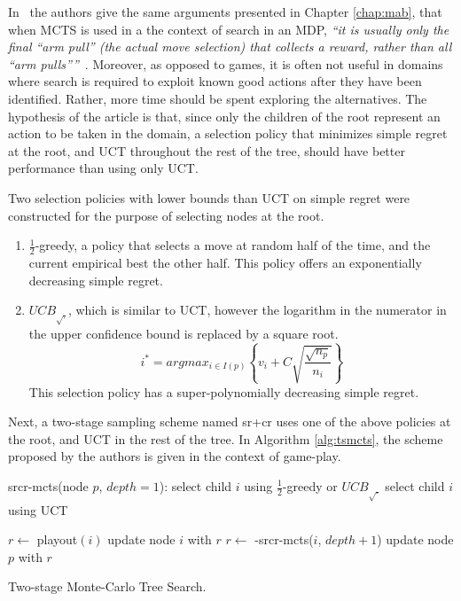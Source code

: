 \documentclass{kecsmstr}
\newcommand{\func}[1]{{\sc #1}}
\begin{document}
In~ the authors give the same arguments presented in Chapter \ref{chap:mab}, that when MCTS is used in a the context of search in an MDP, \emph{``it is usually only the final ``arm pull'' (the actual move selection) that collects a reward, rather than all ``arm pulls''''}~. Moreover, as opposed to games, it is often not useful in domains where search is required to exploit known good actions after they have been identified. Rather, more time should be spent exploring the alternatives. The hypothesis of the article is that, since only the children of the root represent an action to be taken in the domain, a selection policy that minimizes simple regret at the root, and UCT throughout the rest of the tree, should have better performance than using only UCT.

Two selection policies with lower bounds than UCT on simple regret were constructed for the purpose of selecting nodes at the root.
\begin{enumerate}
\item $\frac{1}{2}$-greedy, a policy that selects a move at random half of the time, and the current empirical best the other half. This policy offers an exponentially decreasing simple regret.
\item ${UCB}_{\sqrt{.}}$, which is similar to UCT, however the logarithm in the numerator in the upper confidence bound is replaced by a square root.
\begin{equation}
\label{eq:uctsqrt}
i^* = argmax_{i \in I(p)}\left\{ v_i + C \sqrt{ \frac{\sqrt{n_p}}{n_i}}\right\}
\end{equation}
This selection policy has a super-polynomially decreasing simple regret.
\end{enumerate}

Next, a two-stage sampling scheme named {\sc sr+cr} uses one of the above policies at the root, and UCT in the rest of the tree. In Algorithm \ref{alg:tsmcts}, the scheme proposed by the authors is given in the context of game-play.
\IncMargin{1em}
\begin{algorithm2e}[ht]
	\func{srcr-mcts}(node $p$, $depth = 1$):														\;
	\Indp							
	 {
	select child $i$ using $\frac{1}{2}$-greedy or ${UCB}_{\sqrt{.}}$								\;
	}
	{
	select child $i$ using UCT 																		\;
	}

     {
    	$r \gets$ {\sc playout}$(i)$ 																\;
    	\func{update} node $i$ with $r$																\;
    }
    {
    	$r \gets$ -\func{srcr-mcts}($i$, $depth + 1$)												\;
    }	
    \func{update} node $p$ with $r$																	\;
	\Indm
  \caption{Two-stage Monte-Carlo Tree Search. \label{alg:tsmcts}}
\end{algorithm2e}
\DecMargin{1em}
\end{document}
